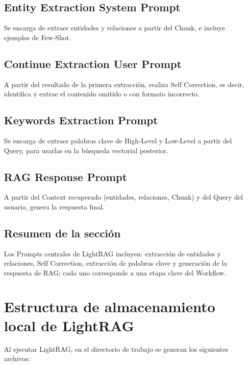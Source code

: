 \documentclass[a4paper]{article}
\begin{document}
\subsection{Entity Extraction System Prompt}

Se encarga de extraer entidades y relaciones a partir del Chunk, e incluye ejemplos de Few-Shot.

\subsection{Continue Extraction User Prompt}

A partir del resultado de la primera extracción, realiza Self Correction, es decir, identifica y extrae el contenido omitido o con formato incorrecto.

\subsection{Keywords Extraction Prompt}

Se encarga de extraer palabras clave de High-Level y Low-Level a partir del Query, para usarlas en la búsqueda vectorial posterior.

\subsection{RAG Response Prompt}

A partir del Context recuperado (entidades, relaciones, Chunk) y del Query del usuario, genera la respuesta final.

\subsection{Resumen de la sección}

Los Prompts centrales de LightRAG incluyen: extracción de entidades y relaciones, Self Correction, extracción de palabras clave y generación de la respuesta de RAG; cada uno corresponde a una etapa clave del Workflow.

\section{Estructura de almacenamiento local de LightRAG}

Al ejecutar LightRAG, en el directorio de trabajo se generan los siguientes archivos:
\end{document}
